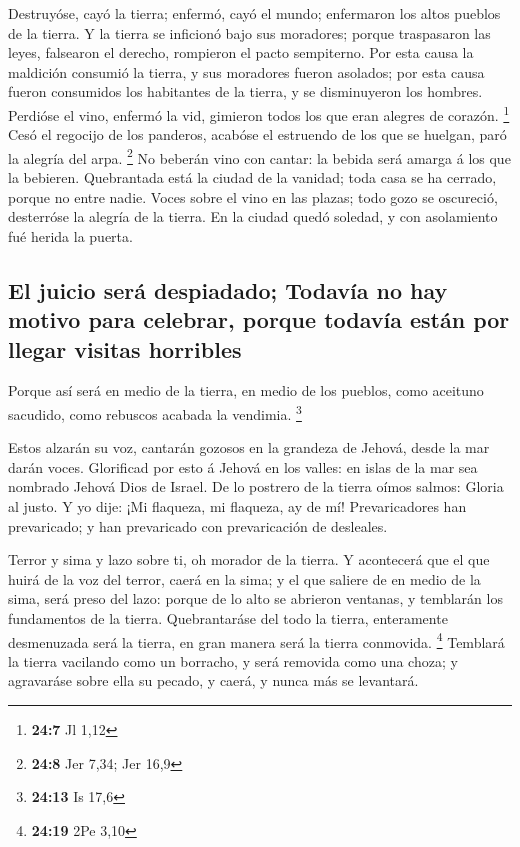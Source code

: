  Destruyóse, cayó la tierra; enfermó, cayó el mundo;
enfermaron los altos pueblos de la tierra.  Y la tierra se
inficionó bajo sus moradores; porque traspasaron las leyes, falsearon el
derecho, rompieron el pacto sempiterno.  Por esta causa la
maldición consumió la tierra, y sus moradores fueron asolados; por esta
causa fueron consumidos los habitantes de la tierra, y se disminuyeron
los hombres.  Perdióse el vino, enfermó la vid, gimieron
todos los que eran alegres de corazón. \footnote{\textbf{24:7} Jl 1,12}
 Cesó el regocijo de los panderos, acabóse el estruendo de
los que se huelgan, paró la alegría del arpa. \footnote{\textbf{24:8}
  Jer 7,34; Jer 16,9}  No beberán vino con cantar: la
bebida será amarga á los que la bebieren.  Quebrantada
está la ciudad de la vanidad; toda casa se ha cerrado, porque no entre
nadie.  Voces sobre el vino en las plazas; todo gozo se
oscureció, desterróse la alegría de la tierra.  En la
ciudad quedó soledad, y con asolamiento fué herida la puerta.

\hypertarget{el-juicio-seruxe1-despiadado-todavuxeda-no-hay-motivo-para-celebrar-porque-todavuxeda-estuxe1n-por-llegar-visitas-horribles}{%
\subsection{El juicio será despiadado; Todavía no hay motivo para
celebrar, porque todavía están por llegar visitas
horribles}\label{el-juicio-seruxe1-despiadado-todavuxeda-no-hay-motivo-para-celebrar-porque-todavuxeda-estuxe1n-por-llegar-visitas-horribles}}

 Porque así será en medio de la tierra, en medio de los
pueblos, como aceituno sacudido, como rebuscos acabada la vendimia.
\footnote{\textbf{24:13} Is 17,6}

 Estos alzarán su voz, cantarán gozosos en la grandeza de
Jehová, desde la mar darán voces.  Glorificad por esto á
Jehová en los valles: en islas de la mar sea nombrado Jehová Dios de
Israel.  De lo postrero de la tierra oímos salmos: Gloria
al justo. Y yo dije: ¡Mi flaqueza, mi flaqueza, ay de mí! Prevaricadores
han prevaricado; y han prevaricado con prevaricación de desleales.

 Terror y sima y lazo sobre ti, oh morador de la tierra.
 Y acontecerá que el que huirá de la voz del terror,
caerá en la sima; y el que saliere de en medio de la sima, será preso
del lazo: porque de lo alto se abrieron ventanas, y temblarán los
fundamentos de la tierra.  Quebrantaráse del todo la
tierra, enteramente desmenuzada será la tierra, en gran manera será la
tierra conmovida. \footnote{\textbf{24:19} 2Pe 3,10} 
Temblará la tierra vacilando como un borracho, y será removida como una
choza; y agravaráse sobre ella su pecado, y caerá, y nunca más se
levantará.

